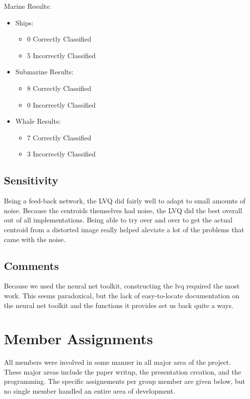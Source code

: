 \documentclass{article}
\begin{document}
Marine Results:
\begin{itemize}
    \item Ships:
    \begin{itemize}
        \item 0 Correctly Classified
        \item 5 Incorrectly Classified
        \end{itemize}
    \item Submarine Results:
    \begin{itemize}
        \item 8 Correctly Classified
        \item 0 Incorrectly Classified
        \end{itemize}
    \item Whale Results:
    \begin{itemize}
        \item 7 Correctly Classified
        \item 3 Incorrectly Classified
        \end{itemize}
\end{itemize}        
\subsection{Sensitivity}
Being a feed-back network, the LVQ did fairly well to adapt to small amounts of noise. Because the centroids themselves had noise, the LVQ did the best overall out of all implementations. Being able to try over and over to get the actual centroid from a distorted image really helped aleviate a lot of the problems that came with the noise.

\subsection{Comments}
Because we used the neural net toolkit, constructing the lvq required the most work. This seems paradoxical, but the lack of easy-to-locate documentation on the neural net toolkit and the functions it provides set us back quite a ways. 
 
\section{Member Assignments}
All members were involved in some manner in all major area of the project. These
major areas include the paper writup, the presentation creation, and the 
programming. The specific assignements per group member are given below, but no
single member handled an entire area of development.
\end{document}
